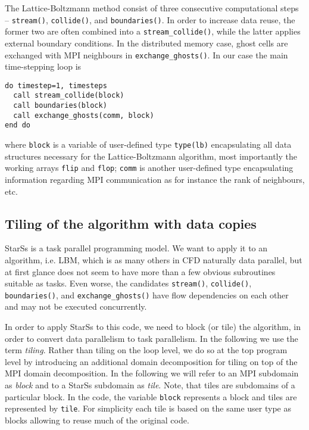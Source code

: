 \documentclass[conference]{IEEEtran}
\newcommand{\starss}{{StarSs}}
\begin{document}
The Lattice-Boltzmann method consist of three consecutive
computational steps -- \verb!stream()!, \verb!collide()!, and
\verb!boundaries()!. In order to increase data reuse, the former two
are often combined into a \verb!stream_collide()!, while the latter
applies external boundary conditions. In the distributed memory case,
ghost cells are exchanged with MPI neighbours in
\verb!exchange_ghosts()!.  In our case the main time-stepping loop is
\begin{lstlisting}
do timestep=1, timesteps
  call stream_collide(block)
  call boundaries(block)
  call exchange_ghosts(comm, block)
end do
\end{lstlisting}
where \verb!block! is a variable of user-defined type \verb!type(lb)! encapsulating
all data structures necessary for the Lattice-Boltzmann algorithm,
most importantly the working arrays \verb!flip! and \verb!flop!;
\verb!comm! is another user-defined type encapsulating information
regarding MPI communication as for instance the rank of neighbours, etc.


\subsection{Tiling of the algorithm with data copies} \label{sec:copies}

\starss{} is a task parallel programming model. We want to
apply it to an algorithm, i.e. LBM, which is as many others in CFD
naturally data parallel, but at first glance does not seem to have more
than a few  obvious subroutines suitable as tasks. Even
worse, the candidates \verb!stream()!, \verb!collide()!,
\verb!boundaries()!, and \verb!exchange_ghosts()! have flow
dependencies on each other and may not be executed concurrently. 

In order to apply \starss{} to this code, we need to block (or tile) the
algorithm, in order to convert data parallelism to task
parallelism. In the following we use the term \emph{tiling}.
Rather than tiling on the loop level, we do so at the
top program level by introducing an additional domain decomposition
for tiling on top of the MPI domain decomposition. In the
following we will refer to an MPI subdomain as {\em block} and to a
\starss{} subdomain as {\em tile}. Note, that tiles are subdomains of a
particular block.  In the code, the variable \verb!block! represents
a block and tiles are represented by \verb!tile!. For simplicity
each tile is based on the same user type as blocks allowing
to reuse much of the original code. 
\end{document}
